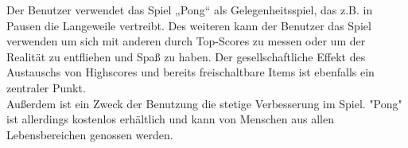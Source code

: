 Der Benutzer verwendet das Spiel „Pong“ als Gelegenheitsspiel, das z.B. in Pausen die Langeweile vertreibt. 
Des weiteren kann der Benutzer das Spiel verwenden um sich mit anderen durch Top-Scores zu messen oder um der Realität zu entfliehen und Spaß zu haben. 
Der gesellschaftliche Effekt des Austauschs von Highscores und bereits freischaltbare Items ist ebenfalls ein zentraler Punkt.
\\
Außerdem ist ein Zweck der Benutzung die stetige Verbesserung im Spiel.
"Pong" ist allerdings kostenlos erhältlich und kann von Menschen aus allen Lebensbereichen genossen werden.